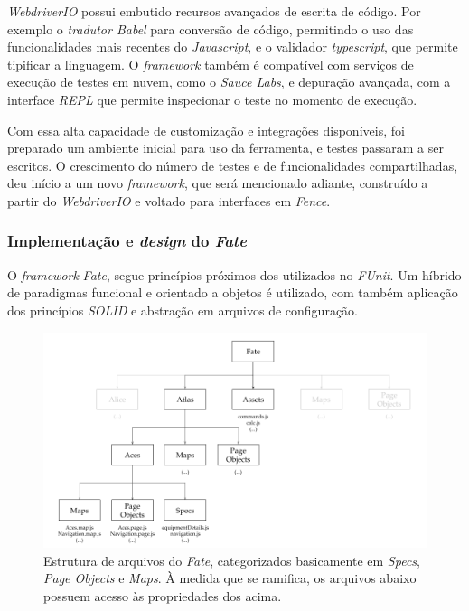 \emph{WebdriverIO} possui embutido recursos avançados de escrita de código. Por exemplo o \emph{tradutor Babel} para conversão de código, permitindo o uso das funcionalidades mais recentes do \emph{Javascript}, e o validador \emph{typescript}, que permite tipificar a linguagem. O \emph{framework} também é compatível com serviços de execução de testes em nuvem, como o \emph{Sauce Labs}, e depuração avançada, com a interface \emph{REPL} que permite inspecionar o teste no momento de execução.

Com essa alta capacidade de customização e integrações disponíveis, foi preparado um ambiente inicial para uso da ferramenta, e testes passaram a ser escritos. O crescimento do número de testes e de funcionalidades compartilhadas, deu início a um novo \emph{framework}, que será mencionado adiante, construído a partir do \emph{WebdriverIO} e voltado para interfaces em \emph{Fence}.

\hypertarget{implementacao-e-design-do-fate}{%
\subsubsection{\texorpdfstring{Implementação e \emph{design} do \emph{Fate}}{Implementação e design do Fate}}\label{implementacao-e-design-do-fate}}

O \emph{framework} \emph{Fate}, segue princípios próximos dos utilizados no \emph{FUnit}. Um híbrido de paradigmas funcional e orientado a objetos é utilizado, com também aplicação dos princípios \emph{SOLID} e abstração em arquivos de configuração.

\begin{figure}[H]
    \centering
    \includegraphics[width=15cm]{source/4-solucao/images/fate-esq-2.png}
    \caption{Estrutura de arquivos do \emph{Fate}, categorizados basicamente em \emph{Specs}, \emph{Page Objects} e \emph{Maps}. À medida que se ramifica, os arquivos abaixo possuem acesso às propriedades dos acima.}
    \label{fig:fate-esq-2}
\end{figure}

